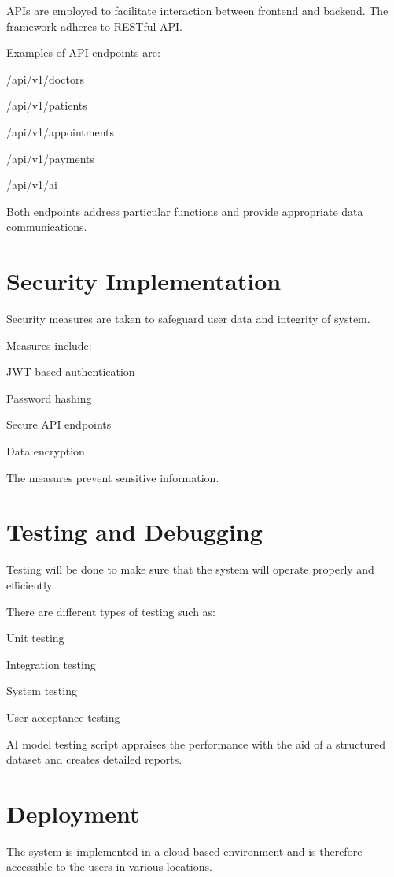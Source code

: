 APIs are employed to facilitate interaction between frontend and backend. The framework adheres to RESTful API.

Examples of API endpoints are:

/api/v1/doctors

/api/v1/patients

/api/v1/appointments

/api/v1/payments

/api/v1/ai

Both endpoints address particular functions and provide appropriate data communications.

\section{Security Implementation}

Security measures are taken to safeguard user data and integrity of system.

Measures include:

JWT-based authentication

Password hashing

Secure API endpoints

Data encryption

The measures prevent sensitive information.

\section{Testing and Debugging}

Testing will be done to make sure that the system will operate properly and efficiently.

There are different types of testing such as:

Unit testing

Integration testing

System testing

User acceptance testing

AI model testing script appraises the performance with the aid of a structured dataset and creates detailed reports.

\section{Deployment}

The system is implemented in a cloud-based environment and is therefore accessible to the users in various locations.

